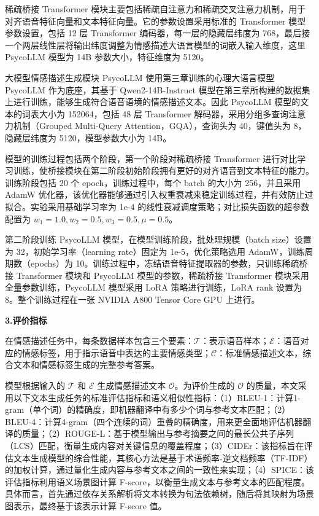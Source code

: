 稀疏桥接 Transformer 模块主要包括稀疏自注意力和稀疏交叉注意力机制，用于对齐语音特征向量和文本特征向量。它的参数设置采用标准的 Transformer 模型参数设置，包括 12 层 Transformer 编码器，每一层的隐藏层纬度为 768，最后接一个两层线性层将输出纬度调整为情感描述大语言模型的词嵌入输入维度，这里 PsycoLLM 模型为 14B 参数大小，特征维度为 5120。

大模型情感描述生成模块 PsycoLLM 使用第三章训练的心理大语言模型 PsycoLLM 作为底座，其基于 Qwen2-14B-Instruct 模型在第三章所构建的数据集上进行训练，能够生成符合语音语境的情感描述文本。因此 PsycoLLM 模型的文本的词表大小为 152064，包括 48 层 Transformer 解码器，采用分组多查询注意力机制（Grouped Multi-Query Attention，GQA），查询头为 40，键值头为 8，隐藏层纬度为 5120，模型参数大小为 14B。

模型的训练过程包括两个阶段，第一个阶段对稀疏桥接 Transformer 进行对比学习训练，使桥接模块在第二阶段初始阶段拥有更好的对齐语音到文本特征的能力。训练阶段包括 20 个 epoch，训练过程中，每个 batch 的大小为 256，并且采用 AdamW 优化器，该优化器能够通过引入权重衰减来稳定训练过程，并有效防止过拟合。实验采用基础学习率为 1e-4 的线性衰减调度策略；对比损失函数的超参数配置为 $w_1 = 1.0, w_2 = 0.5, w_3 = 0.5, \mu = 0.5$。

第二阶段训练 PsycoLLM 模型，在模型训练阶段，批处理规模（batch size）设置为 32，初始学习率（learning rate）固定为 1e-5，优化策略选用 AdamW，训练周期数（epochs）为 10。训练过程中，冻结语音特征提取器的参数，只训练稀疏桥接 Transformer 模块和 PsycoLLM 模型的参数，稀疏桥接 Transformer 模块采用全量参数训练，PsycoLLM 模型采用 LoRA 策略进行训练，LoRA rank 设置为 8。整个训练过程在一张 NVIDIA A800 Tensor Core GPU 上进行。

\textbf{3.评价指标}

在情感描述任务中，每条数据样本包含三个要素：$\mathcal{T}$：表示语音样本；$\mathcal{E}$：语音对应的情感标签，用于指示语音中表达的主要情感类型；$\mathcal{C}$：标准情感描述文本，综合文本和情感标签生成的完整参考答案。

模型根据输入的 $\mathcal{T}$ 和 $\mathcal{E}$ 生成情感描述文本 $\mathcal{O}$。为评价生成的 $\mathcal{O}$ 的质量，本文采用以下文本生成任务的标准评估指标和语义相似性指标：（1）BLEU-1：计算1-gram（单个词）的精确度，即机器翻译中有多少个词与参考文本匹配；（2）BLEU-4：计算4-gram（四个连续的词）重叠的精确度，用来更全面地评估机器翻译的质量；（2）ROUGE-L：基于模型输出与参考摘要之间的最长公共子序列（LCS）匹配，衡量生成内容对关键信息的覆盖程度；（3）CIDEr：该指标旨在评估文本生成模型的综合性能，其核心方法是基于术语频率-逆文档频率（TF-IDF）的加权计算，通过量化生成内容与参考文本之间的一致性来实现；（4）SPICE：该评估指标利用语义场景图计算 F-score，以衡量生成文本与参考文本的匹配程度。具体而言，首先通过依存关系解析将文本转换为句法依赖树，随后将其映射为场景图表示，最终基于该表示计算 F-score 值。

